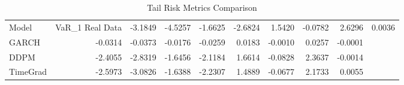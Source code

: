 \begin{table}
\caption{Tail Risk Metrics Comparison}
\label{tab:tail_risk}
\begin{tabular}{lrrrrrrrr}
\toprule
Model & VaR_1%
\midrule
Real Data & -3.1849 & -4.5257 & -1.6625 & -2.6824 & 1.5420 & -0.0782 & 2.6296 & 0.0036 \\
GARCH & -0.0314 & -0.0373 & -0.0176 & -0.0259 & 0.0183 & -0.0010 & 0.0257 & -0.0001 \\
DDPM & -2.4055 & -2.8319 & -1.6456 & -2.1184 & 1.6614 & -0.0828 & 2.3637 & -0.0014 \\
TimeGrad & -2.5973 & -3.0826 & -1.6388 & -2.2307 & 1.4889 & -0.0677 & 2.1733 & 0.0055 \\
\bottomrule
\end{tabular}
\end{table}

